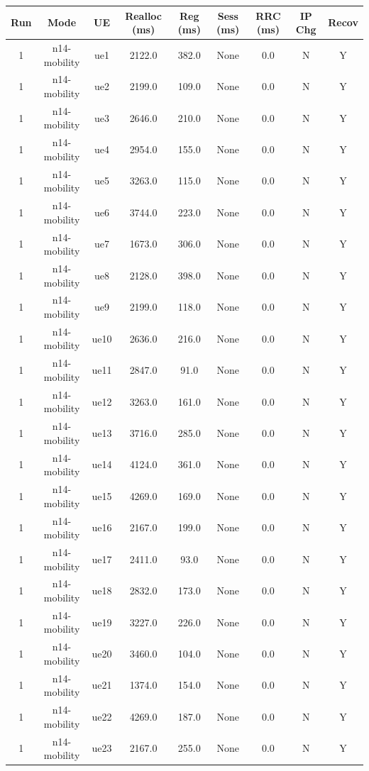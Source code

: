 \begin{table}[ht]
\centering
\begin{tabular}{|c|c|c|c|c|c|c|c|c|}
\hline
Run & Mode & UE & Realloc (ms) & Reg (ms) & Sess (ms) & RRC (ms) & IP Chg & Recov \\
\hline
1 & n14-mobility & ue1 & 2122.0 & 382.0 & None & 0.0 & N & Y \\
1 & n14-mobility & ue2 & 2199.0 & 109.0 & None & 0.0 & N & Y \\
1 & n14-mobility & ue3 & 2646.0 & 210.0 & None & 0.0 & N & Y \\
1 & n14-mobility & ue4 & 2954.0 & 155.0 & None & 0.0 & N & Y \\
1 & n14-mobility & ue5 & 3263.0 & 115.0 & None & 0.0 & N & Y \\
1 & n14-mobility & ue6 & 3744.0 & 223.0 & None & 0.0 & N & Y \\
1 & n14-mobility & ue7 & 1673.0 & 306.0 & None & 0.0 & N & Y \\
1 & n14-mobility & ue8 & 2128.0 & 398.0 & None & 0.0 & N & Y \\
1 & n14-mobility & ue9 & 2199.0 & 118.0 & None & 0.0 & N & Y \\
1 & n14-mobility & ue10 & 2636.0 & 216.0 & None & 0.0 & N & Y \\
1 & n14-mobility & ue11 & 2847.0 & 91.0 & None & 0.0 & N & Y \\
1 & n14-mobility & ue12 & 3263.0 & 161.0 & None & 0.0 & N & Y \\
1 & n14-mobility & ue13 & 3716.0 & 285.0 & None & 0.0 & N & Y \\
1 & n14-mobility & ue14 & 4124.0 & 361.0 & None & 0.0 & N & Y \\
1 & n14-mobility & ue15 & 4269.0 & 169.0 & None & 0.0 & N & Y \\
1 & n14-mobility & ue16 & 2167.0 & 199.0 & None & 0.0 & N & Y \\
1 & n14-mobility & ue17 & 2411.0 & 93.0 & None & 0.0 & N & Y \\
1 & n14-mobility & ue18 & 2832.0 & 173.0 & None & 0.0 & N & Y \\
1 & n14-mobility & ue19 & 3227.0 & 226.0 & None & 0.0 & N & Y \\
1 & n14-mobility & ue20 & 3460.0 & 104.0 & None & 0.0 & N & Y \\
1 & n14-mobility & ue21 & 1374.0 & 154.0 & None & 0.0 & N & Y \\
1 & n14-mobility & ue22 & 4269.0 & 187.0 & None & 0.0 & N & Y \\
1 & n14-mobility & ue23 & 2167.0 & 255.0 & None & 0.0 & N & Y \\

\end{tabular}
\end{table}
